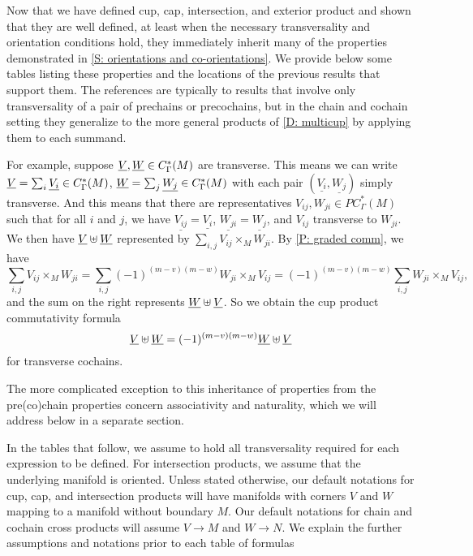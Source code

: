 Now that we have defined cup, cap, intersection, and exterior product and shown that they are well defined, at least when the necessary transversality and orientation conditions hold, they immediately inherit many of the properties demonstrated in \cref{S: orientations and co-orientations}. We provide below some tables listing these properties and the locations of the previous results that support them. The references are typically to results that involve only transversality of a pair of prechains or precochains, but in the chain and cochain setting they generalize to the more general products of \cref{D: multicup} by applying them to each summand.

For example, suppose $\underline{V},\underline{W} \in C^*_\Gamma(M)$ are transverse. This means we can write $\underline{V} = \sum_i \underline{V_i} \in C_\Gamma^*(M)$, $\underline{W} = \sum_j \underline{W_j} \in C_\Gamma^*(M)$ with each pair $(\underline{V_i},\underline{W_j})$ simply transverse. And this means that there are representatives $V_{ij},W_{ji} \in PC_\Gamma^*(M)$ such that for all $i$ and $j$, we have $\underline{V_{ij}} = \underline{V_i}$, $\underline{W_{ji}} = \underline{W_j}$, and $V_{ij}$ transverse to $W_{ji}$. We then have $\underline{V}\uplus \underline{W}$ represented by
$\sum_{i,j} V_{ij} \times_M W_{ji}$. By \cref{P: graded comm}, we have
$$\sum_{i,j} V_{ij} \times_M W_{ji} = \sum_{i,j} (-1)^{(m-v)(m-w)}W_{ji} \times_M V_{ij} = (-1)^{(m-v)(m-w)}\sum_{i,j} W_{ji} \times_M V_{ij},$$
and the sum on the right represents $\underline{W}\uplus \underline{V}$. So we obtain the cup product commutativity formula $$\underline{V}\uplus\underline{W} = (-1)^{(m-v)(m-w)}\underline{W}\uplus\underline{V}$$ for transverse cochains.

The more complicated exception to this inheritance of properties from the pre(co)chain properties concern associativity and naturality, which we will address below in a separate section.






In the tables that follow, we assume to hold all transversality required for each expression to be defined. For intersection products, we assume that the underlying manifold is oriented.
Unless stated otherwise, our default notations for cup, cap, and intersection products will have manifolds with corners $V$ and $W$ mapping to a manifold without boundary $M$. Our default notations for chain and cochain cross products will assume $V \to M$ and $W \to N$. We explain the further assumptions and notations prior to each table of formulas





